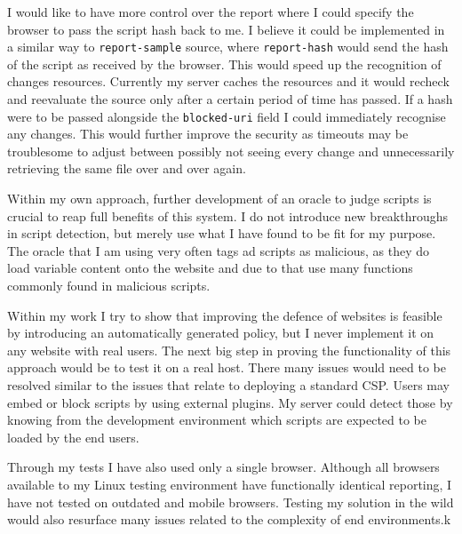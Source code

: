 I would like to have more control over the report where I could specify the browser to pass the script hash back to me.
I believe it could be implemented in a similar way to \texttt{report-sample} source, where \texttt{report-hash} would send the hash of the script as received by the browser.
This would speed up the recognition of changes resources. 
Currently my server caches the resources and it would recheck and reevaluate the source only after a certain period of time has passed.
If a hash were to be passed alongside the \texttt{blocked-uri} field I could immediately recognise any changes.
This would further improve the security as timeouts may be troublesome to adjust between possibly not seeing every change and unnecessarily retrieving the same file over and over again.

Within my own approach, further development of an oracle to judge scripts is crucial to reap full benefits of this system.
I do not introduce new breakthroughs in script detection, but merely use what I have found to be fit for my purpose.
The oracle that I am using very often tags ad scripts as malicious, as they do load variable content onto the website and due to that use many functions commonly found in malicious scripts.

Within my work I try to show that improving the defence of websites is feasible by introducing an automatically generated policy, but I never implement it on any website with real users.
The next big step in proving the functionality of this approach would be to test it on a real host.
There many issues would need to be resolved similar to the issues that relate to deploying a standard CSP.
Users may embed or block scripts by using external plugins. 
My server could detect those by knowing from the development environment which scripts are expected to be loaded by the end users. 

Through my tests I have also used only a single browser.
Although all browsers available to my Linux testing environment have functionally identical reporting, I have not tested on outdated and mobile browsers.
Testing my solution in the wild would also resurface many issues related to the complexity of end environments.k
